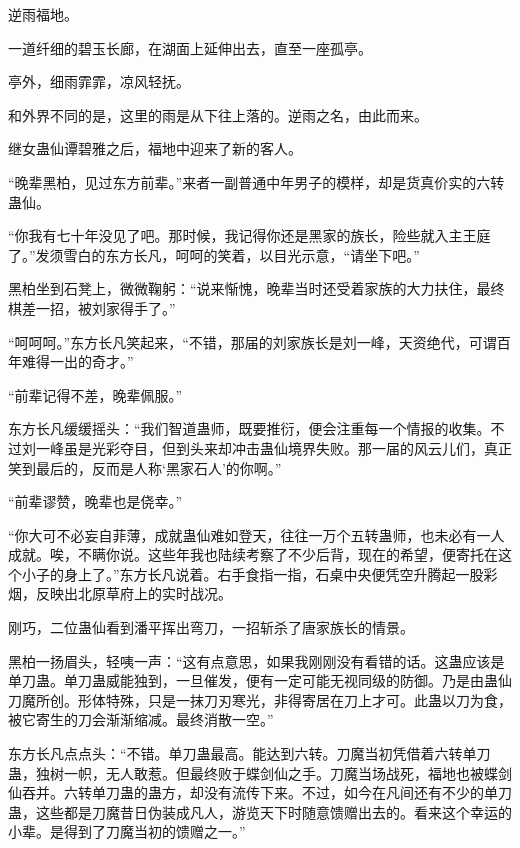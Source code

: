 
\begin{this_body}

逆雨福地。

一道纤细的碧玉长廊，在湖面上延伸出去，直至一座孤亭。

亭外，细雨霏霏，凉风轻抚。

和外界不同的是，这里的雨是从下往上落的。逆雨之名，由此而来。

继女蛊仙谭碧雅之后，福地中迎来了新的客人。

“晚辈黑柏，见过东方前辈。”来者一副普通中年男子的模样，却是货真价实的六转蛊仙。

“你我有七十年没见了吧。那时候，我记得你还是黑家的族长，险些就入主王庭了。”发须雪白的东方长凡，呵呵的笑着，以目光示意，“请坐下吧。”

黑柏坐到石凳上，微微鞠躬：“说来惭愧，晚辈当时还受着家族的大力扶住，最终棋差一招，被刘家得手了。”

“呵呵呵。”东方长凡笑起来，“不错，那届的刘家族长是刘一峰，天资绝代，可谓百年难得一出的奇才。”

“前辈记得不差，晚辈佩服。”

东方长凡缓缓摇头：“我们智道蛊师，既要推衍，便会注重每一个情报的收集。不过刘一峰虽是光彩夺目，但到头来却冲击蛊仙境界失败。那一届的风云儿们，真正笑到最后的，反而是人称‘黑家石人’的你啊。”

“前辈谬赞，晚辈也是侥幸。”

“你大可不必妄自菲薄，成就蛊仙难如登天，往往一万个五转蛊师，也未必有一人成就。唉，不瞒你说。这些年我也陆续考察了不少后背，现在的希望，便寄托在这个小子的身上了。”东方长凡说着。右手食指一指，石桌中央便凭空升腾起一股彩烟，反映出北原草府上的实时战况。

刚巧，二位蛊仙看到潘平挥出弯刀，一招斩杀了唐家族长的情景。

黑柏一扬眉头，轻咦一声：“这有点意思，如果我刚刚没有看错的话。这蛊应该是单刀蛊。单刀蛊威能独到，一旦催发，便有一定可能无视同级的防御。乃是由蛊仙刀魔所创。形体特殊，只是一抹刀刃寒光，非得寄居在刀上才可。此蛊以刀为食，被它寄生的刀会渐渐缩减。最终消散一空。”

东方长凡点点头：“不错。单刀蛊最高。能达到六转。刀魔当初凭借着六转单刀蛊，独树一帜，无人敢惹。但最终败于蝶剑仙之手。刀魔当场战死，福地也被蝶剑仙吞并。六转单刀蛊的蛊方，却没有流传下来。不过，如今在凡间还有不少的单刀蛊，这些都是刀魔昔日伪装成凡人，游览天下时随意馈赠出去的。看来这个幸运的小辈。是得到了刀魔当初的馈赠之一。”


\end{this_body}
